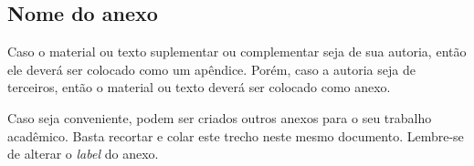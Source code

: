 
\begin{anexosenv}

    \chapter{Nome do anexo}
    \label{chap:anexoA}
    
    Caso o material ou texto suplementar ou complementar seja de sua autoria, então ele deverá ser colocado como um apêndice. Porém, caso a autoria seja de terceiros, então o material ou texto deverá ser colocado como anexo.
    
    Caso seja conveniente, podem ser criados outros anexos para o seu trabalho acadêmico. Basta recortar e colar este trecho neste mesmo documento. Lembre-se de alterar o \textit{label} do anexo.
    
    

\end{anexosenv}
